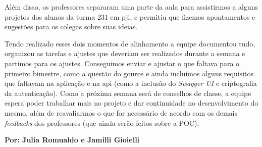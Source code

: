 Além disso, os professores separaram uma parte da aula para assistirmos a alguns projetos dos alunos da turma 231 em \acs{pji}, e permitiu que fizemos apontamentos e sugestões para os colegas sobre suas ideias.

Tendo realizado esses dois momentos de alinhamento a equipe documentou tudo, organizou as tarefas e ajustes que deveriam ser realizados durante a semana e partimos para os ajustes. Conseguimos enviar e ajustar o que faltava para o primeiro bimestre, como a questão do \gls{gource} e ainda incluímos alguns requisitos que faltavam na aplicação e na \gls{api} (como a inclusão do \textit{Swagger UI} e criptografia da autenticação). Como a próxima semana será de conselhos de classe, a equipe espera poder trabalhar mais no projeto e dar continuidade no desenvolvimento do mesmo, além de reavaliarmos o que for necessário de acordo com os demais \textit{feedbacks} dos professores (que ainda serão feitos sobre a \acs{POC}).

\textbf{Por: Julia Romualdo e Jamilli Gioielli}